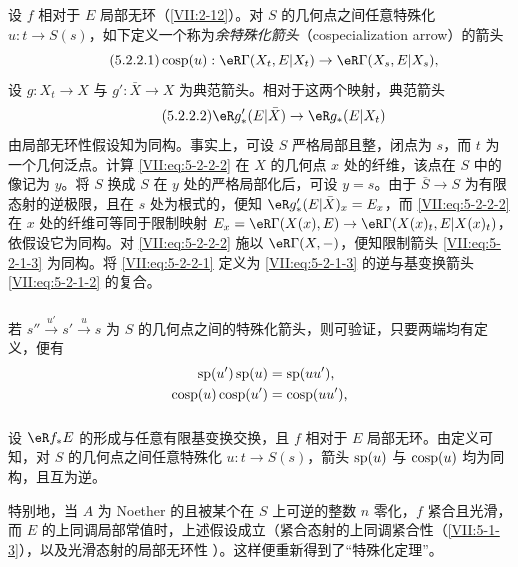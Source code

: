 设 $f$ 相对于 $E$ 局部无环（\ref{VII:2-12}）。对 $S$ 的几何点之间任意特殊化 $u:t\to S(s)$，如下定义一个称为\emph{余特殊化箭头}（cospecialization arrow）的箭头
\begin{equation*}\tag{5.2.2.1}\label{VII:eq:5-2-2-1}
  \cosp(u):\eR\Gamma(X_t,E|X_t) \to \eR\Gamma(X_s,E|X_s) \text{,}
\end{equation*}
设 $g:X_t\to X$ 与 $g':\bar X\to X$ 为典范箭头。相对于这两个映射，典范箭头
\begin{equation*}\tag{5.2.2.2}\label{VII:eq:5-2-2-2}
  \eR g'_\ast(E|\bar X)\to \eR g_\ast(E|X_t)
\end{equation*}
由局部无环性假设知为同构。事实上，可设 $S$ 严格局部且整，闭点为 $s$，而 $t$ 为一个几何泛点。计算 \eqref{VII:eq:5-2-2-2} 在 $X$ 的几何点 $x$ 处的纤维，该点在 $S$ 中的像记为 $y$。将 $S$ 换成 $S$ 在 $y$ 处的严格局部化后，可设 $y=s$。由于 $\bar S\to S$ 为有限态射的逆极限，且在 $s$ 处为根式的，便知 $\eR g'_\ast(E|\bar X)_x = E_x$，而 \eqref{VII:eq:5-2-2-2} 在 $x$ 处的纤维可等同于限制映射 $E_x=\eR\Gamma(X(x),E)\to \eR\Gamma(X(x)_t,E|X(x)_t)$，依假设它为同构。对 \eqref{VII:eq:5-2-2-2} 施以 $\eR\Gamma(X,-)$，便知限制箭头 \eqref{VII:eq:5-2-1-3} 为同构。将 \eqref{VII:eq:5-2-2-1} 定义为 \eqref{VII:eq:5-2-1-3} 的逆与基变换箭头 \eqref{VII:eq:5-2-1-2} 的复合。

\subsubsection{}\label{VII:5-2-3}

若 $s'' \xrightarrow{u'} s' \xrightarrow u s$ 为 $S$ 的几何点之间的特殊化箭头，则可验证，只要两端均有定义，便有
\begin{align*}
  \operatorname{sp}(u')\operatorname{sp}(u) &= \operatorname{sp}(u u') \text{,} \\
  \operatorname{cosp}(u) \operatorname{cosp}(u') &= \operatorname{cosp}(u u') \text{,}
\end{align*}

\subsubsection{}\label{VII:5-2-4}

设 $\eR f_\ast E$ 的形成与任意有限基变换交换，且 $f$ 相对于 $E$ 局部无环。由定义可知，对 $S$ 的几何点之间任意特殊化 $u:t\to S(s)$，箭头 $\operatorname{sp}(u)$ 与 $\operatorname{cosp}(u)$ 均为同构，且互为逆。

特别地，当 $A$ 为 Noether 的且被某个在 $S$ 上可逆的整数 $n$ 零化，$f$ 紧合且光滑，而 $E$ 的上同调局部常值时，上述假设成立（紧合态射的上同调紧合性（\ref{VII:5-1-3}），以及光滑态射的局部无环性 \cite[XV]{sga4}）。这样便重新得到了“特殊化定理”\cite[XVI 2.1]{sga4}。

